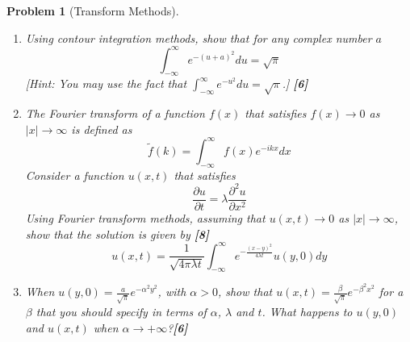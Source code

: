 \documentclass[a4paper]{article}
\theoremstyle{new}
\newtheorem{qns}{Problem}[section]
\begin{document}
\newpage
\begin{qns}[Transform Methods]\leavevmode
\begin{enumerate}[label=(\alph*)]
\item 
Using contour integration methods, show that for any complex number $a$
$$\int_{-\infty}^\infty e^{-(u+a)^2}du=\sqrt{\pi}$$
[Hint: You may use the fact that $\int_{-\infty}^\infty e^{-u^2}du=\sqrt{\pi}$.] \hfill\textbf{[6]}
\item The Fourier transform of a function $f(x)$ that satisfies $f(x)\rightarrow0$ as $|x|\rightarrow\infty$ is defined as
$$\tilde{f}(k)=\int_{-\infty}^\infty f(x)e^{-ikx}dx$$
Consider a function $u(x, t)$ that satisfies
$$\frac{\partial u}{\partial t}=\lambda\frac{\partial^2u}{\partial x^2}$$
Using Fourier transform methods, assuming that $u(x, t)\rightarrow 0$ as $|x|\rightarrow\infty$, show that the
solution is given by \hfill\textbf{[8]}
$$u(x,t)=\frac{1}{\sqrt{4\pi\lambda t}}\int_{-\infty}^\infty e^{-\frac{(x-y)^2}{4\lambda t}}u(y,0)dy$$
\item When $u(y,0)=\frac{a}{\sqrt{\pi}}e^{-\alpha^2y^2}$, with $\alpha>0$, show that $u(x,t)=\frac{\beta}{\sqrt{\pi}}e^{-\beta^2x^2}$ for a $\beta$ that you should specify in terms of $\alpha$, $\lambda$ and $t$. What happens to $u(y, 0)$ and $u(x, t)$ when $\alpha\rightarrow+\infty$?\hfill\textbf{[6]}
\end{enumerate}
\end{qns}
\end{document}
